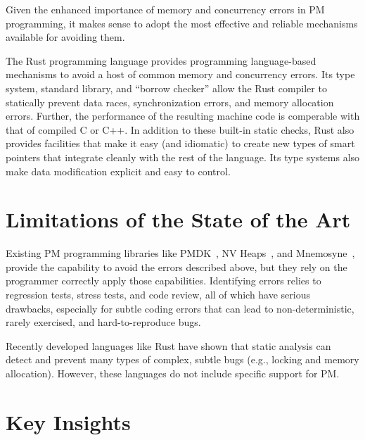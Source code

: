 \documentclass[pageno]{jpaper}
\theoremstyle{invar}
\theoremstyle{goal}
\begin{document}
Given the enhanced importance of memory and concurrency errors in PM
programming, it makes sense to adopt the most effective and reliable mechanisms
available for avoiding them.

The Rust programming language provides programming language-based mechanisms to
avoid a host of common memory and concurrency errors.  Its type system,
standard library, and ``borrow checker'' allow the Rust compiler to statically
prevent data races, synchronization errors, and memory
allocation errors.  Further, the performance of the resulting machine code is
comperable with that of compiled C or C++.  In addition to these built-in
static checks, Rust also provides facilities that make it easy (and idiomatic)
to create new types of smart pointers that integrate cleanly with the rest of
the language.  Its type systems also make data modification explicit and easy to control.


\section{Limitations of the State of the Art}
\label{sec:limitations}

Existing PM programming libraries like PMDK~\cite{pmdk}, NV
Heaps~\cite{nvheaps}, and Mnemosyne~\cite{mnemosyne}, provide the capability to
avoid the errors described above, but they rely on the programmer correctly
apply those capabilities.  Identifying errors relies to regression tests,
stress tests, and code review, all of which have serious drawbacks, especially
for subtle coding errors that can lead to non-deterministic, rarely exercised,
and hard-to-reproduce bugs.

Recently developed languages like Rust have shown that static analysis can detect and
prevent many types of complex, subtle bugs (e.g., locking and memory
allocation).  However, these languages do not include specific support for PM.


\section{Key Insights}
\label{sec:key-insights}
 
\end{document}
